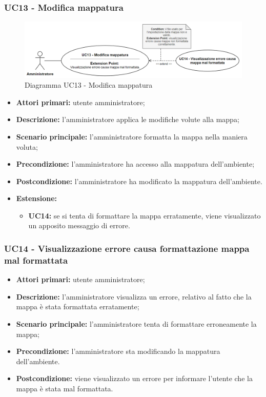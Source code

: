 	\subsubsection{UC13 - Modifica mappatura}
	\begin{figure}[H]
		\centering
		\includegraphics[width=15cm]{images/UC13.png}
		\caption{Diagramma UC13 - Modifica mappatura}
	\end{figure}
	\begin{itemize}
		\item \textbf{Attori primari:} utente amministratore;
		\item \textbf{Descrizione:} l'amministratore applica le modifiche volute alla mappa;
		\item \textbf{Scenario principale:} l'amministratore formatta la mappa nella maniera voluta;		
		\item \textbf{Precondizione:} l'amministratore ha accesso alla mappatura dell'ambiente;
		\item \textbf{Postcondizione:} l'amministratore ha modificato la mappatura dell'ambiente.
		\item \textbf{Estensione:}
		\begin{itemize}
			\item \textbf{UC14:} se si tenta di formattare la mappa erratamente, viene visualizzato un apposito messaggio di errore.
		\end{itemize}
	\end{itemize}

\subsubsection{UC14 - Visualizzazione errore causa formattazione mappa mal formattata}
	\begin{itemize}
		\item \textbf{Attori primari:} utente amministratore;
		\item \textbf{Descrizione:} l'amministratore visualizza un errore, relativo al fatto che la mappa è stata formattata erratamente;
		\item \textbf{Scenario principale:} l'amministratore tenta di formattare erroneamente la mappa;
		\item \textbf{Precondizione:} l'amministratore sta modificando la mappatura dell'ambiente.
		\item \textbf{Postcondizione:} viene visualizzato un errore per informare l'utente che la mappa è stata mal formattata.
	\end{itemize}


